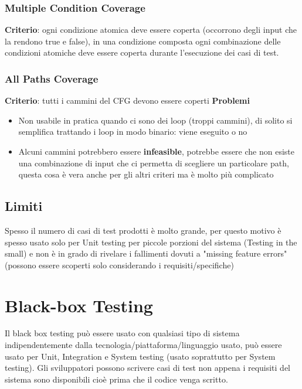 \documentclass[12pt, a4paper]{report}
\begin{document}
\subsubsection{Multiple Condition Coverage}
\textbf{Criterio}: ogni condizione atomica deve essere coperta (occorrono degli input che la rendono true e false), in una condizione composta ogni combinazione delle condizioni atomiche deve essere coperta durante l'esecuzione dei casi di test.
\subsubsection{All Paths Coverage}
\textbf{Criterio}: tutti i cammini del CFG devono essere coperti
\textbf{Problemi}
\begin{itemize}
    \item Non usabile in pratica quando ci sono dei loop (troppi cammini), di solito si semplifica trattando i loop in modo binario: viene eseguito o no
    \item Alcuni cammini potrebbero essere \textbf{infeasible}, potrebbe essere che non esiste una combinazione di input che ci permetta di scegliere un particolare path, questa cosa è vera anche per gli altri criteri ma è molto più complicato
\end{itemize}
\subsection{Limiti}
Spesso il numero di casi di test prodotti è molto grande, per questo motivo è spesso usato solo per Unit testing per piccole porzioni del sistema (Testing in the small) e non è in grado di rivelare i fallimenti dovuti a "missing feature errors" (possono essere scoperti solo considerando i requisiti/specifiche)
\section{Black-box Testing}
Il black box testing può essere usato con qualsiasi tipo di sistema indipendentemente dalla tecnologia/piattaforma/linguaggio usato, può essere usato per Unit, Integration e System testing (usato soprattutto per System testing). Gli sviluppatori possono scrivere casi di test non appena i requisiti del sistema sono disponibili cioè prima che il codice venga scritto.
\end{document}
